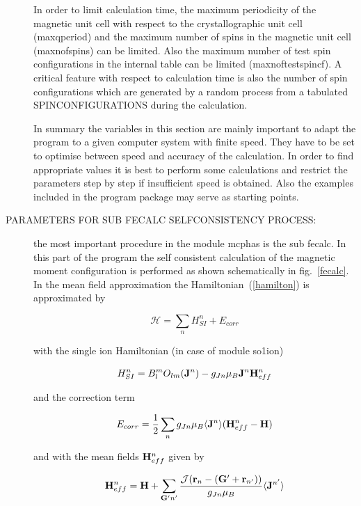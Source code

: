 \begin{description}
In order to limit calculation time, the maximum periodicity
of the magnetic unit cell with respect to the crystallographic unit cell 
(maxqperiod) and the maximum number of spins in the magnetic unit cell 
(maxnofspins) can be limited. Also the maximum number of test spin configurations
in the internal table can be limited (maxnoftestspincf).
A critical feature with respect to calculation time is also the number of
spin configurations which are generated by a random process from a tabulated
SPINCONFIGURATIONS during the calculation. 

In summary the variables in this section are mainly important to adapt the
program to a given computer system with finite speed. They have to be set
to optimise between speed and accuracy of the calculation. In order to
find appropriate values it is best to perform some calculations 
and restrict the parameters step by step if insufficient speed is obtained.
Also the examples included in the program package may serve as starting
points.

\item [PARAMETERS FOR SUB FECALC SELFCONSISTENCY PROCESS:] the most important
procedure in the module {\prg mcphas} is the sub fecalc. In this part of the 
program the self consistent calculation of the magnetic moment configuration
is performed as shown schematically in fig.~\ref{fecalc}. 
In the mean field approximation the Hamiltonian~(\ref{hamilton}) is approximated
by

\begin{equation}
 {\mathcal H}=\sum_n H_{SI}^n + E_{corr}
\end{equation}

with the single ion Hamiltonian (in case of module {\prg so1ion})

\begin{equation}
H_{SI}^n=  B_l^m O_{lm}({\mathbf J}^n) 
	     - g_{Jn} \mu_B {\mathbf J}^n {\mathbf H^n_{eff}} 
\end{equation}

and the correction term

\begin{equation}
E_{corr}=\frac{1}{2}\sum_{n} g_{Jn} \mu_B \langle {\mathbf J}^n
 \rangle (\mathbf H^n_{eff}-\mathbf H) 
\end{equation}

and with the mean fields $ \mathbf H^n_{eff}$ given by

\begin{equation}\label{meanfield}
\mathbf H^n_{eff}=\mathbf H+\sum_{{\mathbf G'}n'} \frac{{\mathcal J}
(\mathbf r_n-(\mathbf G'+\mathbf r_{n'}))}{g_{Jn}\mu_B } \langle{\mathbf J}^{n'}\rangle
\end{equation}


\end{description}
